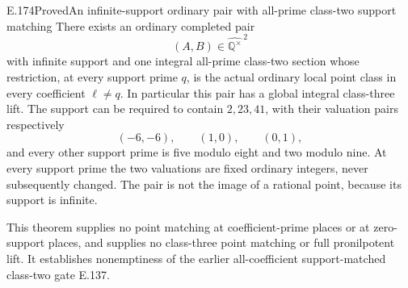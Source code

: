 \begin{result}{E.174}{Proved}{An infinite-support ordinary pair with all-prime class-two support matching}
There exists an ordinary completed pair
\[
 (A,B)\in\widehat{\mathbb Q^\times}^{\,2}
 \tag{E.174.1}
\]
with infinite support and one integral all-prime class-two section
whose restriction, at every support prime \(q\), is the actual
ordinary local point class in every coefficient \(\ell\ne q\).
In particular this pair has a global integral class-three lift.
The support can be required to contain \(2,23,41\), with their
valuation pairs respectively
\[
                  (-6,-6),\qquad(1,0),\qquad(0,1),
 \tag{E.174.2}
\]
and every other support prime is five modulo eight and two modulo
nine. At every support prime the two valuations are fixed ordinary
integers, never subsequently changed. The pair is not the image
of a rational point, because its support is infinite.

This theorem supplies no point matching at coefficient-prime
places or at zero-support places, and supplies no class-three
point matching or full pronilpotent lift. It establishes
nonemptiness of the earlier all-coefficient support-matched
class-two gate E.137.
\end{result}
